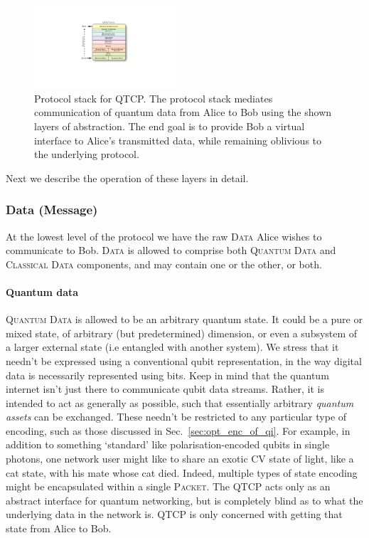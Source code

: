 \begin{figure}[htpb]
\includegraphics[width=0.47\textwidth]{stack}
\caption{Protocol stack for QTCP. The protocol stack mediates communication of quantum data from Alice to Bob using the shown layers of abstraction. The end goal is to provide Bob a virtual interface to Alice's transmitted data, while remaining oblivious to the underlying protocol.} \label{fig:stack}
\end{figure}

Next we describe the operation of these layers in detail.

%
%

\subsubsection{Data (Message)}  \label{sec:data_message_layer}

At the lowest level of the protocol we have the raw \textsc{Data} Alice wishes to communicate to Bob. \textsc{Data} is allowed to comprise both \textsc{Quantum Data} and \textsc{Classical Data} components, and may contain one or the other, or both.

%
%

\paragraph{Quantum data} 

\textsc{Quantum Data} is allowed to be an arbitrary quantum state. It could be a pure or mixed state, of arbitrary (but predetermined) dimension, or even a subsystem of a larger external state (i.e entangled with another system). We stress that it needn't be expressed using a conventional qubit representation, in the way digital data is necessarily represented using bits. Keep in mind that the quantum internet isn't just there to communicate qubit data streams. Rather, it is intended to act as generally as possible, such that essentially arbitrary \textit{quantum assets} can be exchanged. These needn't be restricted to any particular type of encoding, such as those discussed in Sec.~\ref{sec:opt_enc_of_qi}. For example, in addition to something `standard' like polarisation-encoded qubits in single photons, one network user might like to share an exotic CV state of light, like a cat state, with his mate whose cat died. Indeed, multiple types of state encoding might be encapsulated within a single \textsc{Packet}. The QTCP acts only as an abstract interface for quantum networking, but is completely blind as to what the underlying data in the network is. QTCP is only concerned with getting that state from Alice to Bob.

